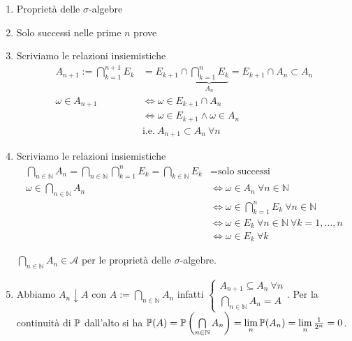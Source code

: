 \begin{enumerate}
\item Proprietà delle $\sigma $-algebre
\item Solo successi nelle prime $n$ prove
\item Scriviamo le relazioni insiemistiche\begin{align*}
A_{n+1} :=\bigcap\limits _{k=1}^{n+1} E_{k} & =E_{k+1} \cap \underbrace{\bigcap\limits _{k=1}^{n} E_{k}}_{A_{n}} =E_{k+1} \cap A_{n} \subset A_{n}\\
\omega \in A_{n+1} & \iff \omega \in E_{k+1} \cap A_{n}\\
 & \iff \omega \in E_{k+1} \land \omega \in A_{n}\\
 & \text{i.e.} \ A_{n+1} \subset A_{n} \ \forall n
\end{align*}
\item Scriviamo le relazioni insiemistiche\begin{align*}
\bigcap\limits _{n\in \mathbb{N}} A_{n} =\bigcap\limits _{n\in \mathbb{N}}\bigcap\limits _{k=1}^{n} E_{k} =\bigcap\limits _{k\in \mathbb{N}} E_{k} & =\text{solo successi}\\
\omega \in \bigcap\limits _{n\in \mathbb{N}} A_{n} & \iff \omega \in A_{n} \ \forall n\in \mathbb{N}\\
 & \iff \omega \in \bigcap\limits _{k=1}^{n} E_{k} \ \forall n\in \mathbb{N}\\
 & \iff \omega \in E_{k} \ \forall n\in \mathbb{N} \ \forall k=1,\dotsc ,n\\
 & \iff \omega \in E_{k} \ \forall k
\end{align*}

$\bigcap\limits _{n\in \mathbb{N}} A_{n} \in \mathcal{A}$ per le proprietà delle $\sigma $-algebre.
\item Abbiamo $A_{n} \downarrow A$ con $A:=\bigcap\limits _{n\in \mathbb{N}} A_{n}$ infatti $\begin{cases}
A_{n+1} \subseteq A_{n} \ \forall n\\
\bigcap\nolimits _{n\in \mathbb{N}} A_{n} =A
\end{cases}$. Per la continuità di $\P$ dall'alto si ha $\P( A) =\P\left(\bigcap\limits _{n\in \mathbb{N}} A_{n}\right) =\lim\limits _{n}\P( A_{n}) =\lim\limits _{n}\frac{1}{2^{n}} =0$.
\end{enumerate}
\Soluzione
